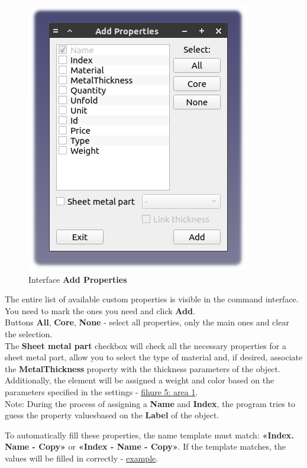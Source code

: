 \documentclass[a4paper,12pt]{article}
\begin{document}
\begin{figure}[htp]
\centering
\includegraphics[scale=0.8]{img/properties_add.png}
\caption{Interface \textbf{Add Properties}}
\label{sec:properties_add}
\end{figure}

The entire list of available custom properties is visible in the command interface. You need to mark the ones you need and click \textbf{Add}.\\

Buttons \textbf{All}, \textbf{Core}, \textbf{None} - select all properties, only the main ones and clear the selection.\\

The \textbf{Sheet metal part} checkbox will check all the necessary properties for a sheet metal part, allow you to select the type of material and, if desired, associate the \textbf{MetalThickness} property with the thickness parameters of the object. Additionally, the element will be assigned a weight and color based on the parameters specified in the settings - \hyperref[sec:pref_sm]{fihure 5: area 1}.\\

Note: During the process of assigning a \textbf{Name} and \textbf{Index}, the program tries to guess the property values ​​based on the \textbf{Label} of the object.

To automatically fill these properties, the name template must match: \textbf{«Index. Name - Copy»} or \textbf{«Index - Name - Copy»}. If the template matches, the values ​​will be filled in correctly - \hyperref[sec:properties]{example}.
\end{document}
